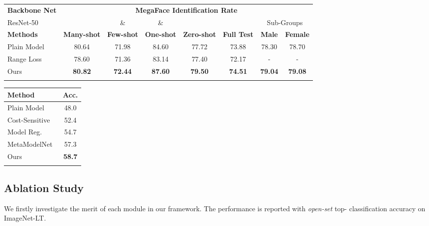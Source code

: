 \documentclass[10pt,twocolumn,letterpaper]{article}
\begin{document}
\begin{table*}
\footnotesize
\parbox{.7\linewidth}{
\centering
\begin{tabular}{l|ccccc|cc}
\Xhline{1pt}
\textbf{Backbone Net} & \multicolumn{7}{c}{\footnotesize{\textbf{MegaFace Identification Rate}}}  \\
ResNet-50 &  &  \&  &  \&  &  & & \multicolumn{2}{c}{Sub-Groups} \\
\textbf{Methods} & \textbf{Many-shot} & \textbf{Few-shot} & \textbf{One-shot} & \textbf{Zero-shot} & \textbf{Full Test} & \textbf{Male} & \textbf{Female} \\
\hline\hline
Plain Model~\cite{he2016deep} & 80.64 & 71.98 & 84.60 & 77.72 & 73.88 & 78.30 & 78.70 \\ 
Range Loss~\cite{zhang2017range} & 78.60 & 71.36 & 83.14 & 77.40 & 72.17 & - & - \\ 
Ours & \textbf{80.82} & \textbf{72.44} & \textbf{87.60} & \textbf{79.50} & \textbf{74.51} & \textbf{79.04} & \textbf{79.08} \\
\Xhline{1pt}
\end{tabular}
}
\hfill
\parbox{.2\linewidth}{
\centering
\begin{tabular}{lc}
\Xhline{1pt}
\textbf{Method} & \textbf{Acc.} \\
\hline\hline
Plain Model~\cite{he2016deep} & 48.0 \\
Cost-Sensitive~\cite{huang2016learning} & 52.4 \\
Model Reg.~\cite{wang2016learning} & 54.7 \\
MetaModelNet~\cite{wang2017learning} & 57.3 \\
\hline
Ours & \textbf{58.7} \\
\Xhline{1pt}
\end{tabular}
}
\caption{\textbf{Benchmarking results on MegaFace (\emph{left}) and SUN-LT (\emph{right}).} Our approach achieves the best performance on natural-world datasets when compared to other state-of-the-art methods. Furthermore, our approach achieves across-board improvements on both `male' and `female' sub-groups.}
\label{tab:benchmark_megaface}
\end{table*}



\subsection{Ablation Study}
\label{sec:ablation}

We firstly investigate the merit of each module in our framework.
The performance is reported with \emph{open-set} top- classification accuracy on ImageNet-LT.
\end{document}
